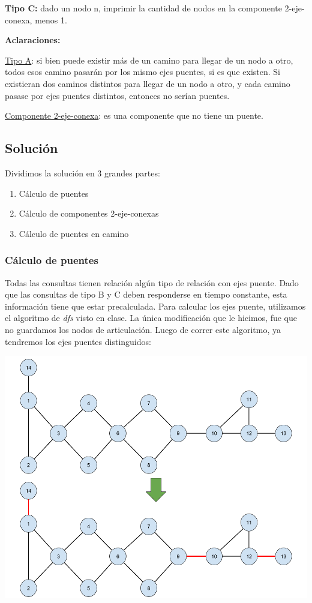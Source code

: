 \textbf{Tipo C:} dado un nodo n, imprimir la cantidad de nodos en la componente 2-eje-conexa, menos 1.

\hfill \break \noindent
\textbf{Aclaraciones:}

\underline{Tipo A}: si bien puede existir más de un camino para llegar de un nodo a otro, todos esos camino pasarán por los mismo ejes puentes, si es que existen. Si existieran dos caminos distintos para llegar de un nodo a otro, y cada camino pasase por ejes puentes distintos, entonces no serían puentes.

\underline{Componente 2-eje-conexa}: es una componente que no tiene un puente.

\subsection{Solución}
Dividimos la solución en 3 grandes partes:
\begin{enumerate}
\item Cálculo de puentes
\item Cálculo de componentes 2-eje-conexas
\item Cálculo de puentes en camino
\end{enumerate}

\subsubsection{Cálculo de puentes}
\noindent
Todas las consultas tienen relación algún tipo de relación con ejes puente. Dado que las consultas de tipo B y C deben responderse en tiempo constante, esta información tiene que estar precalculada.
\noindent
Para calcular los ejes puente, utilizamos el algoritmo de \textit{dfs} visto en clase. La única modificación que le hicimos, fue que no guardamos los nodos de articulación.
\noindent
Luego de correr este algoritmo, ya tendremos los ejes puentes distinguidos:

\includegraphics[scale=0.4]{Imagenes/Imagen2}

